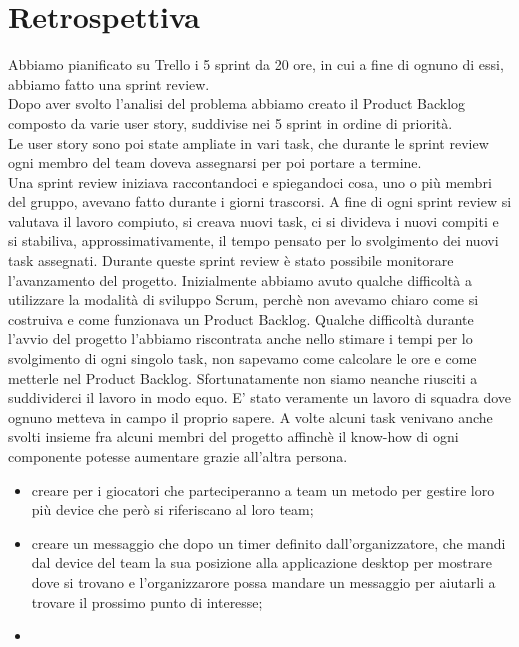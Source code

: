 \documentclass[12pt, italian]{article}
\begin{document}
\section{Retrospettiva}
Abbiamo pianificato su Trello i 5 sprint da 20 ore, in cui a fine di ognuno di essi, abbiamo fatto una sprint review.\\Dopo aver svolto l'analisi del problema abbiamo creato il Product Backlog composto da varie user story, suddivise nei 5 sprint in ordine di priorità. \\
Le user story sono poi state ampliate in vari task, che durante le sprint review ogni membro del team doveva assegnarsi per poi portare a termine. \\Una sprint review iniziava raccontandoci e spiegandoci cosa, uno o più membri del gruppo, avevano fatto durante i giorni trascorsi. A fine di ogni sprint review si valutava il lavoro compiuto, si creava nuovi task, ci si divideva i nuovi compiti e si stabiliva, approssimativamente, il tempo pensato per lo svolgimento dei nuovi task assegnati. Durante queste sprint review è stato possibile monitorare l'avanzamento del progetto. Inizialmente abbiamo avuto qualche difficoltà a utilizzare la modalità di sviluppo Scrum, perchè non avevamo chiaro come si costruiva e come funzionava un Product Backlog. Qualche difficoltà durante l'avvio del progetto l'abbiamo riscontrata anche nello stimare i tempi per lo svolgimento di ogni singolo task, non sapevamo come calcolare le ore e come metterle nel Product Backlog. Sfortunatamente non siamo neanche riusciti a suddividerci il lavoro in modo equo. E' stato veramente un lavoro di squadra dove ognuno metteva in campo il proprio sapere. A volte alcuni task venivano anche svolti insieme fra alcuni membri del progetto affinchè il know-how di ogni componente potesse aumentare grazie all'altra persona.

\begin{itemize}
	\item creare per i giocatori che parteciperanno a team un metodo per gestire loro più device che però si riferiscano al loro team;
	\item creare un messaggio che dopo un timer definito dall'organizzatore, che mandi dal device del team la sua posizione alla applicazione desktop per mostrare dove si trovano e l'organizzarore possa mandare un messaggio per aiutarli a trovare il prossimo punto di interesse;
	\item 
\end{itemize}
\vspace{-30pt}
\end{document}
